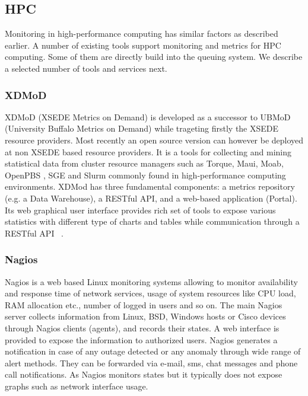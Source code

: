 \documentclass{sig-alternate-05-2015}
\begin{document}
\subsection{HPC}

Monitoring in high-performance computing has similar factors as
described earlier. A number of existing tools support monitoring and
metrics for HPC computing. Some of them are directly build into the
queuing system. We describe a selected number of tools and services
next.

\subsubsection{XDMoD}

XDMoD (XSEDE Metrics on Demand)
\cite{las14cloudmeshmultiple,las14Impact,las12xdmod-kernel} is developed as a
successor to UBMoD (University Buffalo Metrics on Demand) while trageting
firstly the XSEDE resource providers. Most recently an open source version can
however be deployed at non XSEDE based resource providers. It is a tools for
collecting and mining statistical data from cluster resource managers such as
Torque\cite{staples2006torque}, Maui\cite{jackson2001core},
Moab\cite{computing2012moab}, OpenPBS \cite{teambatching},
SGE\cite{gentzsch2001sun} and Slurm \cite{jette2010slurm} commonly found in
high-performance computing environments. XDMod has three fundamental
components: a metrics repository (e.g. a Data Warehouse), a RESTful API, and a
web-based application (Portal).  Its web graphical user interface provides rich
set of tools to expose various statistics with different type of charts and
tables while communication through a RESTful API
~\cite{CPE:CPE2871,Furlani:2013:UXF:2484762.2484763}.

\subsubsection{Nagios}

Nagios \cite{barth2008nagios} is a web based Linux monitoring systems allowing
to monitor availability and response time of network services, usage of system
resources like CPU load, RAM allocation etc., number of logged in
users and so on. The main Nagios server collects information from
Linux, BSD, Windows hosts or Cisco devices through Nagios clients
(agents), and records their states. A web interface is provided to
expose the information to authorized users.  Nagios generates a
notification in case of any outage detected or any anomaly through
wide range of alert methods. They can be forwarded via e-mail, sms,
chat messages and phone call notifications. As Nagios monitors states
but it typically does not expose graphs such as network interface
usage.
\end{document}
